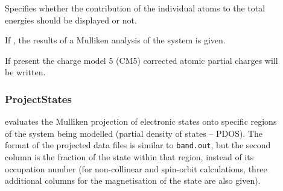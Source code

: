 \begin{description}

\item[] Specifies whether the contribution of the
  individual atoms to the total energies should be displayed or not.

\item[] If , the results of a Mulliken analysis of
  the system is given.

\item[] If present the charge model 5 (CM5)\cite{marenich2012} corrected
  atomic partial charges will be written.

\subsubsection{ProjectStates} 
\label{sec:dftbp.ProjectStates} evaluates the Mulliken
projection of electronic states onto specific regions of the system being
modelled (partial density of states -- PDOS). The format of the projected data
files is similar to \verb|band.out|, but the second column is the fraction of
the state within that region, instead of its occupation number (for
non-collinear and spin-orbit calculations, three additional columns for the
magnetisation of the state are also given).


\end{description}
